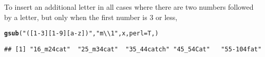 \documentclass[12pt, a4paper, oneside]{article}\usepackage[]{graphicx}\usepackage[]{color}
\makeatletter
\newcommand{\hlstr}[1]{\textcolor[rgb]{0.192,0.494,0.8}{#1}}%
\newcommand{\hlstd}[1]{\textcolor[rgb]{0.345,0.345,0.345}{#1}}%
\newcommand{\hlkwc}[1]{\textcolor[rgb]{0.333,0.667,0.333}{#1}}%
\newcommand{\hlkwd}[1]{\textcolor[rgb]{0.737,0.353,0.396}{\textbf{#1}}}%
\newenvironment{kframe}{%
 \def\at@end@of@kframe{}%
 \ifinner\ifhmode%
  \def\at@end@of@kframe{\end{minipage}}%
  \begin{minipage}{\columnwidth}%
 \fi\fi%
 \def\FrameCommand##1{\hskip\@totalleftmargin \hskip-\fboxsep
 \colorbox{shadecolor}{##1}\hskip-\fboxsep
     \hskip-\linewidth \hskip-\@totalleftmargin \hskip\columnwidth}%
 \MakeFramed {\advance\hsize-\width
   \@totalleftmargin\z@ \linewidth\hsize
   \@setminipage}}%
 {\par\unskip\endMakeFramed%
 \at@end@of@kframe}
\newenvironment{knitrout}{}{} %
\makeatother
\begin{document}
To insert an additional letter in all cases where there are two numbers followed by a letter, but only when the first number is 3 or less, 
\begin{knitrout}
\color{fgcolor}\begin{kframe}
\begin{alltt}
\hlkwd{gsub}\hlstd{(}\hlstr{"([1-3][1-9][a-z])"}\hlstd{,} \hlstr{"m\textbackslash{}\textbackslash{}1"}\hlstd{, x,} \hlkwc{perl} \hlstd{= T, )}
\end{alltt}
\begin{verbatim}
## [1] "16_m24cat"  "25_m34cat"  "35_44catch" "45_54Cat"   "55-104fat"
\end{verbatim}
\end{kframe}
\end{knitrout}
\end{document}
